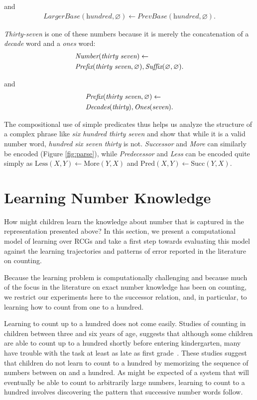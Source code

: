 \documentclass[10pt,letterpaper]{article}
\begin{document}
\noindent and
\begin{align}
  \textit{LargerBase}(\textit{hundred}, \varnothing) \leftarrow \textit{PrevBase}(\textit{hundred}, \varnothing).
\end{align}

\noindent\emph{Thirty-seven} is one of these numbers because it is
merely the concatenation of a \emph{decade} word and a \emph{ones}
word:
\begin{align}
  & \textit{Number}(\textit{thirty seven}) \leftarrow\\
  & \textit{Prefix}(\textit{thirty seven}, \varnothing), \textit{Suffix}(\varnothing,\varnothing).\notag
\end{align}

\noindent and
\begin{align}
  & \textit{Prefix}(\textit{thirty seven}, \varnothing) \leftarrow\\
  & \textit{Decades}(\textit{thirty}), \textit{Ones}(\textit{seven}).\notag
\end{align}


\noindent The compositional use of simple predicates thus helps us
analyze the structure of a complex phrase like \emph{six hundred
  thirty seven} and show that while it is a valid number word,
\emph{hundred six seven thirty} is not. \emph{Successor} and
\emph{More} can similarly be encoded (Figure \ref{fig:parse}), while
\emph{Predecessor} and \emph{Less} can be encoded quite simply as
$\text{Less}(X,Y) \leftarrow \text{More}(Y,X)$ and $\text{Pred}(X,Y)
\leftarrow \text{Succ}(Y,X)$.

\section{Learning Number Knowledge}

How might children learn the knowledge about number that is captured
in the representation presented above? In this section, we present a
computational model of learning over RCGs and take a first step
towards evaluating this model against the learning trajectories and
patterns of error reported in the literature on counting. 

Because the learning problem is computationally challenging and
because much of the focus in the literature on exact number knowledge
has been on counting, we restrict our experiments here to the
successor relation, and, in particular, to learning how to count from
one to a hundred.

Learning to count up to a hundred does not come easily. Studies of
counting in children between three and six years of age, suggests that
although some children are able to count up to a hundred shortly
before entering kindergarten, many have trouble with the task at least
as late as first
grade~\citep{FusRicBriar1982,miller1987counting}. These studies suggest
that children do not learn to count to a hundred by memorizing the
sequence of numbers between on and a hundred. As might be expected of
a system that will eventually be able to count to arbitrarily large
numbers, learning to count to a hundred involves discovering the
pattern that successive number words follow. 
\end{document}
